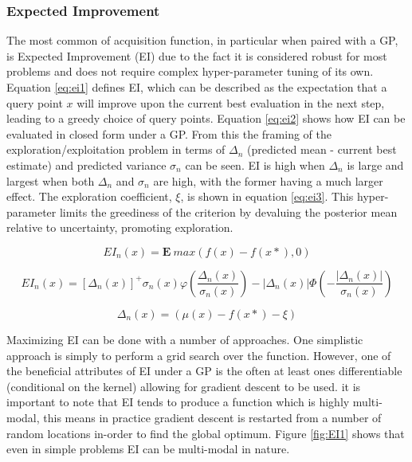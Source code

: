		\subsubsection{Expected Improvement}\label{EI}

			The most common of acquisition function, in particular when paired with a GP, is Expected Improvement (EI) due to the fact it is considered robust for most problems and does not require complex hyper-parameter tuning of its own. Equation \ref{eq:ei1} defines EI, which can be described as the expectation that a query point \(x\) will improve upon the current best evaluation in the next step, leading to a greedy choice of query points. Equation \ref{eq:ei2} shows how EI can be evaluated in closed form under a GP. From this the framing of the exploration/exploitation problem in terms of \(\Delta_n\) (predicted mean - current best estimate) and predicted variance \(\sigma_n\) can be seen. EI is high when \(\Delta_n\) is large and largest when both  \(\Delta_n\) and \(\sigma_n\) are high, with the former having a much larger effect. The exploration coefficient, \(\xi\), is shown in equation \ref{eq:ei3}. This hyper-parameter limits the greediness of the criterion by devaluing the posterior mean relative to uncertainty, promoting exploration.

			 

			\begin{equation}\label{eq:ei1} EI_n(x) = \mathbf{E} ~max(f(x) -f(x*),0)\end{equation}

			\begin{equation}\label{eq:ei2} EI_n(x) = [\Delta_n(x)]^+ \sigma_n(x)\varphi\left(\frac{\Delta_n(x)}{\sigma_n(x)}\right)  - |\Delta_n(x)| \Phi\left(-\frac{|\Delta_n(x)|}{\sigma_n(x)}\right)\end{equation}

			\begin{equation}\label{eq:ei3}\Delta_n(x) = (\mu(x) - f(x*) - \xi) \end{equation}


			Maximizing EI can be done with a number of approaches. One simplistic approach is simply to perform a grid search over the function. However, one of the beneficial attributes of EI under a GP is the often at least ones differentiable (conditional on the kernel) allowing for gradient descent to be used. it is important to note that EI tends to produce a function which is highly multi-modal, this means in practice gradient descent is restarted from a number of random locations in-order to find the global optimum. Figure \ref{fig:EI1} shows that even in simple problems EI can be multi-modal in nature.
				

